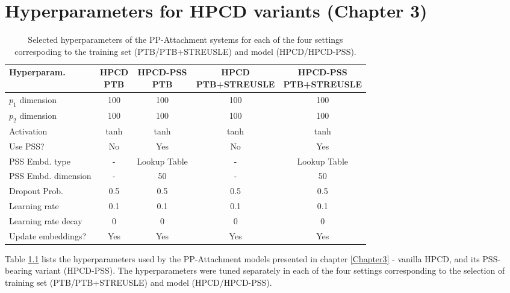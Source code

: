 
\chapter{Hyperparameters for HPCD variants (Chapter 3)} %

\label{AppendixB} %

\begin{table}[h]
  \small
	\centering
	\begin{tabular}{@{}l|cccc@{}}
		\toprule
		Hyperparam. & \thead{HPCD\\PTB} & \thead{HPCD-PSS\\PTB} & \thead{HPCD\\PTB+STREUSLE} & \thead{HPCD-PSS\\PTB+STREUSLE}\\
		\midrule
            $p_1$ dimension & 100 & 100 & 100 & 100 \\
            $p_2$ dimension & 100 & 100 & 100 & 100 \\
            Activation & tanh & tanh & tanh & tanh \\
            Use PSS? & No & Yes & No & Yes \\
            PSS Embd. type & - & Lookup Table & - & Lookup Table \\
            PSS Embd. dimension& - & 50 & - & 50 \\
            Dropout Prob. & 0.5 & 0.5 & 0.5 & 0.5 \\
            Learning rate & 0.1 & 0.1 & 0.1 & 0.1 \\
            Learning rate decay& 0 & 0 & 0 & 0 \\
            Update embeddings? & Yes & Yes & Yes & Yes \\
		\bottomrule
	\end{tabular}
	\caption{\label{tab:hyperparamsB}
        Selected hyperparameters of the PP-Attachment systems for each of the four settings correspoding to the training set (PTB/PTB+STREUSLE) and model (HPCD/HPCD-PSS).
	}

\end{table}

Table \ref{tab:hyperparamsB} lists the hyperparameters used by the PP-Attachment models presented in chapter \ref{Chapter3} - vanilla HPCD, and its PSS-bearing variant (HPCD-PSS). The hyperparameters were tuned separately in each of the four settings corresponding to the selection of training set (PTB/PTB+STREUSLE) and model (HPCD/HPCD-PSS). 


